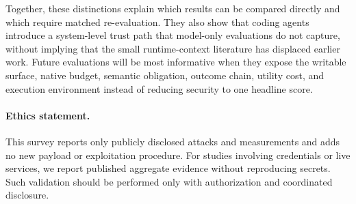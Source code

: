 \documentclass[acmsmall,screen,review]{acmart}
\begin{document}
Together, these distinctions explain which results can be compared directly and which require matched re-evaluation. They also show that coding agents introduce a system-level trust path that model-only evaluations do not capture, without implying that the small runtime-context literature has displaced earlier work. Future evaluations will be most informative when they expose the writable surface, native budget, semantic obligation, outcome chain, utility cost, and execution environment instead of reducing security to one headline score.

\paragraph*{Ethics statement.} This survey reports only publicly disclosed attacks and measurements and adds no new payload or exploitation procedure. For studies involving credentials or live services, we report published aggregate evidence without reproducing secrets. Such validation should be performed only with authorization and coordinated disclosure.



\end{document}
